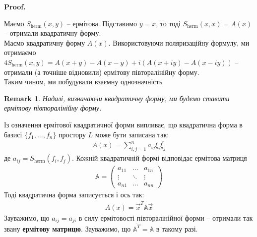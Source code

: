 \documentclass[a4paper, 10pt]{article}
\makeatletter
\theoremstyle{theoremdd}
\newtheorem{remark}[theorem]{Remark}
\renewenvironment{proof}[1][Proof.\\]{\par
\pushQED{\hfill \qed}%
\normalfont \topsep6\p@\@plus6\p@\relax
\trivlist
\item\relax
{\bfseries
#1\@addpunct{.}}\hspace\labelsep\ignorespaces
}{%
\popQED\endtrivlist\@endpefalse
}
\makeatother
\begin{document}
\begin{proof}
Маємо $S_{\text{herm}}(x,y)$ -- ермітова. Підставимо $y = x$, то тоді $S_{\text{herm}}(x,x) = A(x)$ -- отримали квадратичну форму.\\
Маємо квадратичну форму $A(x)$. Використовуючи поляризаційну формулу, ми отримаємо $4S_{\text{herm}}(x,y) = A(x+y) - A(x-y) + i(A(x+iy) - A(x-iy))$ -- отримали (а точніше відновили) ермітову півторалінійну форму. \\
Таким чином, ми побудували взаємну однозначність
\end{proof}

\begin{remark}
Надалі, визначаючи квадратичну форму, ми будемо ставити ермітову півторалінійну форму.
\end{remark}

\noindent
Із означення ермітової квадратичної форми випливає, що квадратична форма в базисі $\{f_1,\dots,f_n\}$ простору $L$ може бути записана так:
\begin{align*}
A(x) = \displaystyle\sum_{i,j=1}^n a_{ij} \xi_i \overline{\xi_j}
\end{align*}
де $a_{ij} = S_{\text{herm}}(f_i,f_j)$. Кожній квадратичній формі відповідає ермітова матриця
\begin{align*}
\mathbb{A} = \begin{pmatrix}
a_{11} & \dots & a_{1n} \\
\vdots & \ddots & \vdots \\
a_{n1} & \dots & a_{nn}
\end{pmatrix}
\end{align*}
Тоді квадратична форма записується і ось так:
\begin{align*}
A(x) = \vec{x}^T \mathbb{A} \vec{x}
\end{align*}
\noindent
Зауважимо, що $a_{ij} = a_{ji}$ в силу ермітовості півторалінійної форми -- отримали так звану \textbf{ермітову матрицю}. Зауважимо, що $\overline{\mathbb{A}^T} = \mathbb{A}$ в такому разі.
\end{document}
